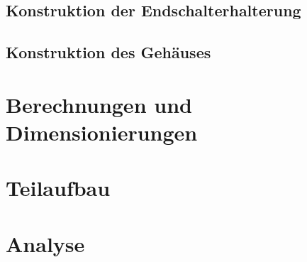 \subsection{Konstruktion der Endschalterhalterung}

\subsection{Konstruktion des Gehäuses}

\section{Berechnungen und Dimensionierungen}

\section{Teilaufbau}

\section{Analyse}